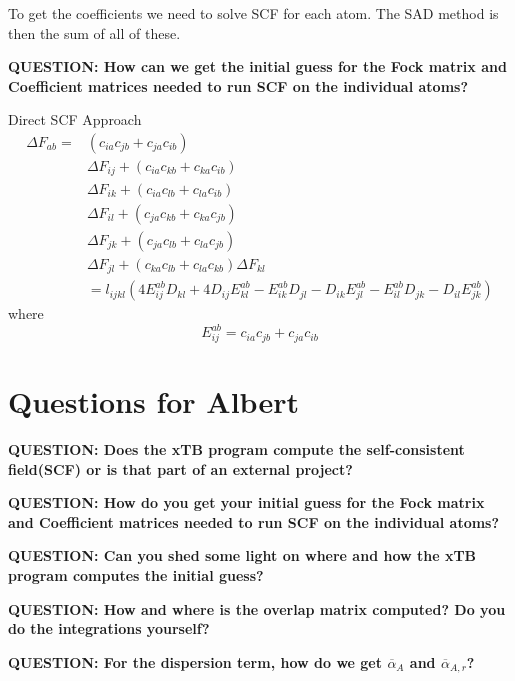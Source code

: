 \documentclass{article}
\newcommand{\q}[1]{\textbf{QUESTION: #1}}
\begin{document}
To get the coefficients we need to solve SCF for each atom.
The SAD method is then the sum of all of these.

\vspace{10pt}
\noindent
\q{How can we get the initial guess for the Fock matrix and Coefficient matrices needed to run SCF on the individual atoms?}

Direct SCF Approach
\begin{equation}
\begin{split}
  \Delta F_{ab} = &(c_{ia}c_{jb} + c_{ja}c_{ib})\\
  &\Delta F_{ij} + (c_{ia}c_{kb} + c_{ka}c_{ib})\\
  &\Delta F_{ik} + (c_{ia}c_{lb} + c_{la}c_{ib})\\
  &\Delta F_{il} + (c_{ja}c_{kb} + c_{ka}c_{jb})\\
  &\Delta F_{jk} + (c_{ja}c_{lb} + c_{la}c_{jb})\\
  &\Delta F_{jl} + (c_{ka}c_{lb} + c_{la}c_{kb}) \Delta F_{kl}\\
  &= l_{ijkl}(4E_{ij}^{ab}D_{kl} + 4D_{ij}E_{kl}^{ab} - E_{ik}^{ab}D_{jl} - D_{ik}E_{jl}^{ab} - E_{il}^{ab}D_{jk} - D_{il}E_{jk}^{ab})
\end{split}
\end{equation}
where
\begin{equation}
  E_{ij}^{ab} = c_{ia}c_{jb} + c_{ja}c_{ib}
\end{equation}



\section{Questions for Albert}

\q{Does the xTB program compute the self-consistent field(SCF) or is that part of an external project?}

\vspace{10pt}
\noindent
\q{How do you get your initial guess for the Fock matrix and Coefficient matrices needed to run SCF on the individual atoms?}

\vspace{10pt}
\noindent
\q{Can you shed some light on where and how the xTB program computes the initial guess?}

\vspace{10pt}
\noindent
\q{How and where is the overlap matrix computed? Do you do the integrations yourself?}

\vspace{10pt}
\noindent
\q{For the dispersion term, how do we get \(\overline{\alpha}_A\) and \(\overline{\alpha}_{A,r}\)?}
\end{document}
